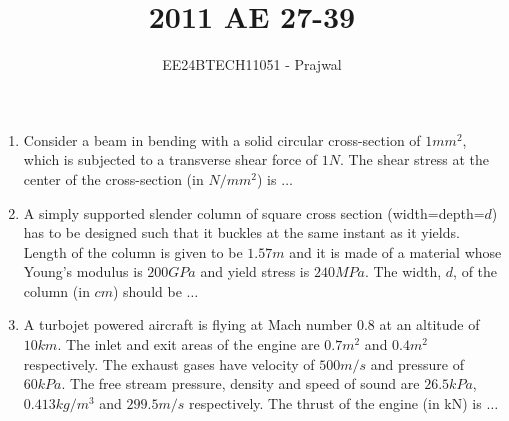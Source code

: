 \documentclass[journal,12pt,onecolumn]{IEEEtran}
\theoremstyle{remark}
\begin{document}

\vspace{3cm}

\title{2011 AE 27-39}
\author{EE24BTECH11051 - Prajwal}
\maketitle

\bigskip

\renewcommand{\thefigure}{\theenumi}
\renewcommand{\thetable}{\theenumi}


\begin{enumerate}
\item Consider a beam in bending with a solid circular cross-section of $1mm^2$, which is subjected to a transverse shear force of $1N$. The shear stress at the center of the cross-section (in $N/mm^2$) is $\dots$
 
\item A simply supported slender column of square cross section (width=depth=$d$) has to be designed such that it buckles at the same instant as it yields. Length of the column is given to be $1.57m$ and
it is made of a material whose Young’s modulus is $200GPa$ and yield stress is $240MPa$. The width, $d$, of the column (in $cm$) should be $\dots$

\item A turbojet powered aircraft is flying at Mach number 0.8 at an altitude of $10km$. The inlet and exit areas of the engine are $0.7m^2$ and $0.4m^2$ respectively. The exhaust gases have velocity of $500 m/s$ and pressure of $60kPa$. The free stream pressure, density and speed of sound are $26.5kPa$, $0.413kg/m^3$ and $299.5m/s$ respectively. The thrust of the engine (in kN) is $\dots$


\end{enumerate}
\end{document}
